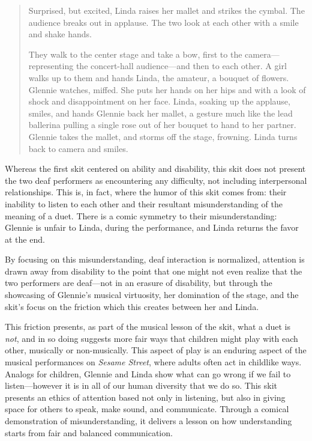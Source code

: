 \documentclass[12pt,letterpaper]{article}
\begin{document}
\begin{quote}
	Surprised, but excited, Linda raises her mallet and strikes the cymbal. 
	The audience breaks out in applause. The two look at each other with a 
	smile and shake hands. 

	They walk to the center stage and take a bow, first to the camera---
	representing the concert-hall audience---and then to each other. A girl 
	walks up to them and hands Linda, the amateur, a bouquet of flowers. 
	Glennie watches, miffed. She puts her hands on her hips and with a look 
	of shock and disappointment on her face. Linda, soaking up the applause, 
	smiles, and hands Glennie back her mallet, a gesture much like the lead 
	ballerina pulling a single rose out of her bouquet to hand to her 
	partner. Glennie takes the mallet, and storms off the stage, frowning. 
	Linda turns back to camera and smiles.   
	
	\end{quote}

	Whereas the first skit centered on ability and disability, this skit 
	does not present the two deaf performers as encountering any difficulty,
	not including interpersonal relationships. This is, in fact, where the
	humor of this skit comes from: their inability to listen to each other
	and their resultant misunderstanding of the meaning of a duet. There is
	a comic symmetry to their misunderstanding: Glennie is unfair to Linda, 
	during the performance, and Linda returns the favor at the end. 

	By focusing on this misunderstanding, deaf interaction is normalized,
	attention is drawn away from disability to the point that one might not
	even realize that the two performers are deaf---not in an erasure of 
	disability, but through the showcasing of Glennie's musical virtuosity,
	her domination of the stage, and the skit's focus on the friction
	which this creates between her and Linda.  

	This friction presents, as part of the musical lesson of the skit, 
	what a duet is \textit{not}, and in so doing suggests more fair ways
	that children might play with each other, musically or non-musically.
	This aspect of play is an enduring aspect of the musical performances
	on \textit{Sesame Street}, where adults often act in childlike ways.
	Analogs for children, Glennie and Linda show what can go wrong if we
	fail to listen---however it is in all of our human diversity that we
	do so. This skit presents an ethics of attention based not only in
	listening, but also in giving space for others to speak, make sound,
	and communicate. Through a comical demonstration of misunderstanding, 
	it delivers a lesson on how understanding starts from fair and balanced
	communication.	
\end{document}
